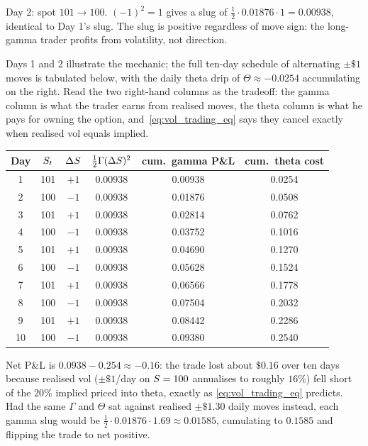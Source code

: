 Day 2: spot $101 \to 100$. $(-1)^2 = 1$ gives a slug of
$\tfrac12 \cdot 0.01876 \cdot 1 = 0.00938$, identical to Day
1's slug. The slug is positive regardless of move sign: the
long-gamma trader profits from volatility, not direction.

Days 1 and 2 illustrate the mechanic; the full ten-day schedule
of alternating $\pm \$1$ moves is tabulated below, with the daily
theta drip of $\Theta \approx -0.0254$ accumulating on the right.
Read the two right-hand columns as the tradeoff: the gamma column
is what the trader earns from realised moves, the theta column is
what he pays for owning the option, and~\eqref{eq:vol_trading_eq}
says they cancel exactly when realised vol equals implied.

\begin{center}
\begin{tabular}{cccccc}
\toprule
Day & $S_t$ & $\Delta S$ & $\tfrac12 \Gamma (\Delta S)^2$
    & cum.\ gamma P\&L & cum.\ theta cost \\
\midrule
1  & 101 & $+1$ & 0.00938 & 0.00938 & 0.0254 \\
2  & 100 & $-1$ & 0.00938 & 0.01876 & 0.0508 \\
3  & 101 & $+1$ & 0.00938 & 0.02814 & 0.0762 \\
4  & 100 & $-1$ & 0.00938 & 0.03752 & 0.1016 \\
5  & 101 & $+1$ & 0.00938 & 0.04690 & 0.1270 \\
6  & 100 & $-1$ & 0.00938 & 0.05628 & 0.1524 \\
7  & 101 & $+1$ & 0.00938 & 0.06566 & 0.1778 \\
8  & 100 & $-1$ & 0.00938 & 0.07504 & 0.2032 \\
9  & 101 & $+1$ & 0.00938 & 0.08442 & 0.2286 \\
10 & 100 & $-1$ & 0.00938 & 0.09380 & 0.2540 \\
\bottomrule
\end{tabular}
\end{center}

Net P\&L is $0.0938 - 0.254 \approx -0.16$: the trade lost about
$\$0.16$ over ten days because realised vol ($\pm \$1$/day on
$S = 100$ annualises to roughly $16\%$) fell short of the
$20\%$ implied priced into theta, exactly as
\eqref{eq:vol_trading_eq} predicts. Had the same $\Gamma$ and
$\Theta$ sat against realised $\pm \$1.30$ daily moves instead,
each gamma slug would be $\tfrac12 \cdot 0.01876 \cdot 1.69
\approx 0.01585$, cumulating to $0.1585$ and flipping the trade
to net positive.

